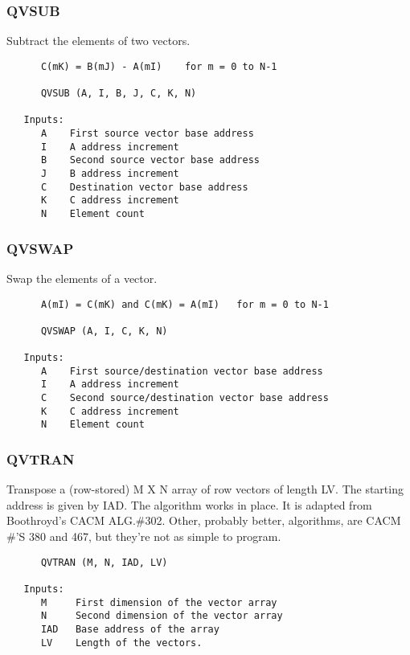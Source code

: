 \subsubsection{QVSUB }
Subtract the elements of two vectors.

\begin{verbatim}
      C(mK) = B(mJ) - A(mI)    for m = 0 to N-1

      QVSUB (A, I, B, J, C, K, N)

   Inputs:
      A    First source vector base address
      I    A address increment
      B    Second source vector base address
      J    B address increment
      C    Destination vector base address
      K    C address increment
      N    Element count

\end{verbatim}
\subsubsection{QVSWAP }
Swap the elements of a vector.

\begin{verbatim}
      A(mI) = C(mK) and C(mK) = A(mI)   for m = 0 to N-1

      QVSWAP (A, I, C, K, N)

   Inputs:
      A    First source/destination vector base address
      I    A address increment
      C    Second source/destination vector base address
      K    C address increment
      N    Element count

\end{verbatim}
\subsubsection{QVTRAN }
Transpose a (row-stored) M X N array of row vectors of length LV.  The
starting address is given by IAD.  The algorithm works in place.  It
is adapted from Boothroyd's CACM ALG.\#302.  Other, probably better,
algorithms, are CACM \#'S 380 and 467, but they're not as simple to
program.

\begin{verbatim}
      QVTRAN (M, N, IAD, LV)

   Inputs:
      M     First dimension of the vector array
      N     Second dimension of the vector array
      IAD   Base address of the array
      LV    Length of the vectors.

\end{verbatim}

